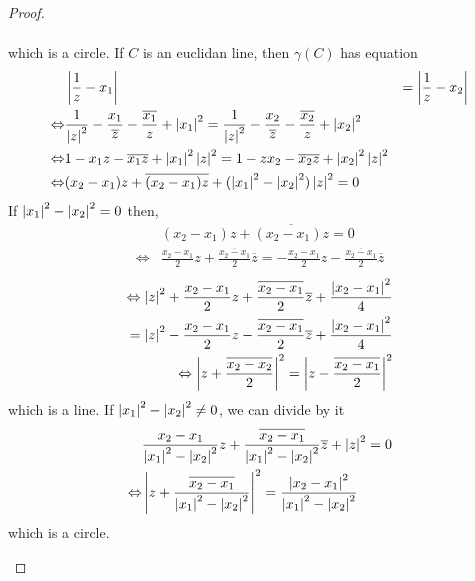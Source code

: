 \documentclass{article}
\begin{document}
\begin{proof}
\begin{enumerate}[cases]
\begin{align*}
        \end{align*}
        which is a circle. If $C$ is an euclidan line, then $\gamma(C)$ has equation
        \begin{align*}
            &\left\lvert \frac{1}{z} - x_1\right\rvert &= \left\lvert \frac{1}{z} - x_2\right\rvert \\
            \Leftrightarrow& \frac{1}{\left\lvert z\right\rvert^2} - \frac{x_1}{\overline{z}} - \frac{\overline{x_1}}{z} + \left\lvert x_1\right\rvert^2 = \frac{1}{\left\lvert z\right\rvert^2} - \frac{x_2}{\overline{z}} - \frac{\overline{x_2}}{z} + \left\lvert x_2\right\rvert^2 \\
            \Leftrightarrow& 1 - x_1z - \overline{x_1}\overline{z} + \left\lvert x_1\right\rvert^2\left\lvert z\right\rvert^2 = 1 - zx_2 - \overline{x_2}\overline{z} + \left\lvert x_2\right\rvert^2\left\lvert z\right\rvert^2 \\
            \Leftrightarrow& (x_2 - x_1)z + \overline{(x_2 - x_1)z} + (\left\lvert x_1\right\rvert^2 - \left\lvert x_2\right\rvert^2)\left\lvert z\right\rvert^2 = 0
        \end{align*}
        If $\left\lvert x_1\right\rvert^2 - \left\lvert x_2\right\rvert^2 = 0$ then,
        \begin{align*}
            &(x_2 - x_1)z + \overline{(x_2 - x_1)z} = 0 \\
            \Leftrightarrow& \frac{x_2 - x_1}{2} z + \frac{\overline{x_2 - x_1}}{2}\overline{z} = - \frac{x_2 - x_1}{2} z - \frac{\overline{x_2 - x_1}}{2}\overline{z}
        \end{align*}
        \begin{align*}
            \Leftrightarrow \left\lvert z\right\rvert^2 + \frac{x_2 - x_1}{2} z + \frac{\overline{x_2 - x_1}}{2}\overline{z} + \frac{\left\lvert x_2 - x_1\right\rvert^2}{4} \\
            = \left\lvert z\right\rvert^2 - \frac{x_2 - x_1}{2} z - \frac{\overline{x_2 - x_1}}{2}\overline{z} + \frac{\left\lvert x_2 - x_1\right\rvert^2}{4} \\
            \Leftrightarrow \left\lvert z + \frac{\overline{x_2 - x_2}}{2}\right\rvert^2 = \left\lvert z - \frac{\overline{x_2 - x_1}}{2}\right\rvert^2
        \end{align*}
        which is a line. If $\left\lvert x_1\right\rvert^2 - \left\lvert x_2\right\rvert^2 \neq 0$, we can divide by it
        \begin{align*}
            &\frac{x_2 - x_1}{\left\lvert x_1\right\rvert^2 - \left\lvert x_2\right\rvert^2}z + \frac{\overline{x_2 - x_1}}{\left\lvert x_1\right\rvert^2 - \left\lvert x_2\right\rvert^2}\overline{z} + \left\lvert z\right\rvert^2 = 0 \\
            \Leftrightarrow& \left\lvert z + \frac{\overline{x_2 - x_1}}{\left\lvert x_1\right\rvert^2 - \left\lvert x_2\right\rvert^2}\right\rvert^2 = \frac{\left\lvert x_2 - x_1\right\rvert^2}{\left\lvert x_1\right\rvert^2 - \left\lvert x_2\right\rvert^2}
        \end{align*}
        which is a circle.
    \end{enumerate}
\end{proof}
\end{document}
